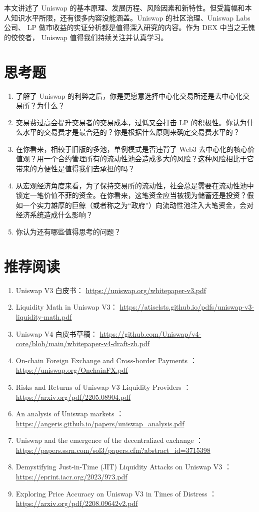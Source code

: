 \documentclass[12pt, a4paper, oneside]{ctexart}
\begin{document}
本文讲述了 Uniswap 的基本原理、发展历程、风险因素和新特性。但受篇幅和本人知识水平所限，还有很多内容没能涵盖。Uniswap 的社区治理、Uniswap Labs 公司、 LP 做市收益的实证分析都是值得深入研究的内容。作为 DEX 中当之无愧的佼佼者， Uniswap 值得我们持续关注并认真学习。

\section*{思考题}

\begin{enumerate}
    \item 了解了 Uniswap 的利弊之后，你是更愿意选择中心化交易所还是去中心化交易所？为什么？
    \item 交易费过高会提升交易者的交易成本，过低又会打击 LP 的积极性。你认为什么水平的交易费才是最合适的？你是根据什么原则来确定交易费水平的？
    \item 在你看来，相较于旧版的多池，单例模式是否违背了 Web3 去中心化的核心价值观？用一个合约管理所有的流动性池会造成多大的风险？这种风险相比于它带来的方便性是值得我们去承担的吗？
    \item 从宏观经济角度来看，为了保持交易所的流动性，社会总是需要在流动性池中锁定一笔价值不菲的资金。在你看来，这笔资金应当被视为储蓄还是投资？假如一个实力雄厚的巨鲸（或者称之为“政府”）向流动性池注入大笔资金，会对经济系统造成什么影响？
    \item 你认为还有哪些值得思考的问题？
\end{enumerate}

\section*{推荐阅读}

\begin{enumerate}
    \item Uniswap V3 白皮书： \url{https://uniswap.org/whitepaper-v3.pdf}
    \item Liquidity Math in Uniswap V3： \url{https://atiselsts.github.io/pdfs/uniswap-v3-liquidity-math.pdf}
    \item Uniswap V4 白皮书草稿： \url{https://github.com/Uniswap/v4-core/blob/main/whitepaper-v4-draft-zh.pdf}
    \item On-chain Foreign Exchange and Cross-border Payments ： \url{https://uniswap.org/OnchainFX.pdf}
    \item Risks and Returns of Uniswap V3 Liquidity Providers ： \url{https://arxiv.org/pdf/2205.08904.pdf}
    \item An analysis of Uniswap markets ： \url{https://angeris.github.io/papers/uniswap_analysis.pdf}
    \item Uniswap and the emergence of the decentralized exchange ： \url{https://papers.ssrn.com/sol3/papers.cfm?abstract_id=3715398}
    \item Demystifying Just-in-Time (JIT) Liquidity Attacks on Uniswap V3 ： \url{https://eprint.iacr.org/2023/973.pdf}
    \item Exploring Price Accuracy on Uniswap V3 in Times of Distress ： \url{https://arxiv.org/pdf/2208.09642v2.pdf}
\end{enumerate}
\end{document}
